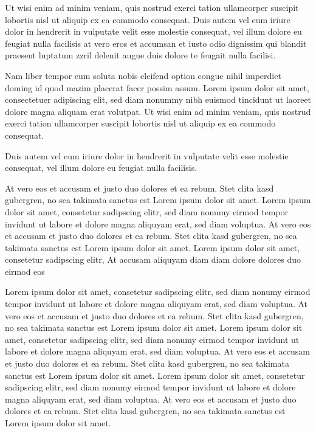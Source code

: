 \documentclass[]{../metanetpaper}
\begin{document}
\begin{Parallel}[c]{80mm}{80mm}
{    Ut wisi enim ad minim veniam, quis nostrud exerci tation ullamcorper suscipit lobortis nisl ut aliquip ex ea commodo consequat. Duis autem vel eum iriure dolor in hendrerit in vulputate velit esse molestie consequat, vel illum dolore eu feugiat nulla facilisis at vero eros et accumsan et iusto odio dignissim qui blandit praesent luptatum zzril delenit augue duis dolore te feugait nulla facilisi.   

    Nam liber tempor cum soluta nobis eleifend option congue nihil imperdiet doming id quod mazim placerat facer possim assum. Lorem ipsum dolor sit amet, consectetuer adipiscing elit, sed diam nonummy nibh euismod tincidunt ut laoreet dolore magna aliquam erat volutpat. Ut wisi enim ad minim veniam, quis nostrud exerci tation ullamcorper suscipit lobortis nisl ut aliquip ex ea commodo consequat.   

    Duis autem vel eum iriure dolor in hendrerit in vulputate velit esse molestie consequat, vel illum dolore eu feugiat nulla facilisis.   

    At vero eos et accusam et justo duo dolores et ea rebum. Stet clita kasd gubergren, no sea takimata sanctus est Lorem ipsum dolor sit amet. Lorem ipsum dolor sit amet, consetetur sadipscing elitr, sed diam nonumy eirmod tempor invidunt ut labore et dolore magna aliquyam erat, sed diam voluptua. At vero eos et accusam et justo duo dolores et ea rebum. Stet clita kasd gubergren, no sea takimata sanctus est Lorem ipsum dolor sit amet. Lorem ipsum dolor sit amet, consetetur sadipscing elitr, At accusam aliquyam diam diam dolore dolores duo eirmod eos
    
    
    Lorem ipsum dolor sit amet, consetetur sadipscing elitr, sed diam nonumy eirmod tempor invidunt ut labore et dolore magna aliquyam erat, sed diam voluptua. At vero eos et accusam et justo duo dolores et ea rebum. Stet clita kasd gubergren, no sea takimata sanctus est Lorem ipsum dolor sit amet. Lorem ipsum dolor sit amet, consetetur sadipscing elitr, sed diam nonumy eirmod tempor invidunt ut labore et dolore magna aliquyam erat, sed diam voluptua. At vero eos et accusam et justo duo dolores et ea rebum. Stet clita kasd gubergren, no sea takimata sanctus est Lorem ipsum dolor sit amet. Lorem ipsum dolor sit amet, consetetur sadipscing elitr, sed diam nonumy eirmod tempor invidunt ut labore et dolore magna aliquyam erat, sed diam voluptua. At vero eos et accusam et justo duo dolores et ea rebum. Stet clita kasd gubergren, no sea takimata sanctus est Lorem ipsum dolor sit amet.   

}
\end{Parallel}
\end{document}
